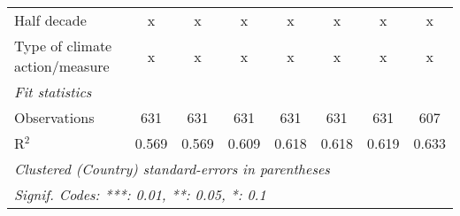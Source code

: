 \begin{tabular}{lccccccc}
   Half decade                                                                               & x           & x           & x             & x             & x             & x             & x\\  
   Type of climate action/measure                                                            & x           & x           & x             & x             & x             & x             & x\\  
   \midrule \emph{Fit statistics}\\
   Observations                                                                              & 631         & 631         & 631           & 631           & 631           & 631           & 607\\  
   R$^2$                                                                                     & 0.569       & 0.569       & 0.609         & 0.618         & 0.618         & 0.619         & 0.633\\  
   \midrule
   \multicolumn{8}{l}{\emph{Clustered (Country) standard-errors in parentheses}}\\
   \multicolumn{8}{l}{\emph{Signif. Codes: ***: 0.01, **: 0.05, *: 0.1}}\\
\end{tabular}
\par\endgroup


